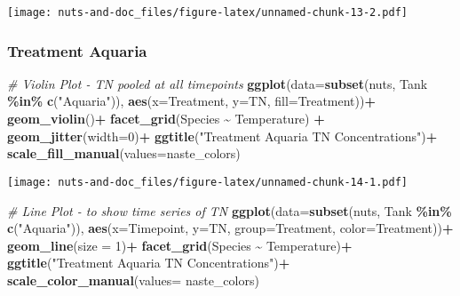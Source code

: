 \documentclass[
]{article}
\newenvironment{Shaded}{\begin{snugshade}}{\end{snugshade}}
\newcommand{\AttributeTok}[1]{\textcolor[rgb]{0.13,0.29,0.53}{#1}}
\newcommand{\CommentTok}[1]{\textcolor[rgb]{0.56,0.35,0.01}{\textit{#1}}}
\newcommand{\DecValTok}[1]{\textcolor[rgb]{0.00,0.00,0.81}{#1}}
\newcommand{\FunctionTok}[1]{\textcolor[rgb]{0.13,0.29,0.53}{\textbf{#1}}}
\newcommand{\NormalTok}[1]{#1}
\newcommand{\SpecialCharTok}[1]{\textcolor[rgb]{0.81,0.36,0.00}{\textbf{#1}}}
\newcommand{\StringTok}[1]{\textcolor[rgb]{0.31,0.60,0.02}{#1}}
\begin{document}
\texttt{[image: nuts-and-doc\_files/figure-latex/unnamed-chunk-13-2.pdf]}

\hypertarget{treatment-aquaria-3}{%
\subsubsection{Treatment Aquaria}\label{treatment-aquaria-3}}

\begin{Shaded}
\begin{Highlighting}[]
\CommentTok{\# Violin Plot {-} TN pooled at all timepoints}
\FunctionTok{ggplot}\NormalTok{(}\AttributeTok{data=}\FunctionTok{subset}\NormalTok{(nuts, Tank }\SpecialCharTok{\%in\%} \FunctionTok{c}\NormalTok{(}\StringTok{"Aquaria"}\NormalTok{)), }\FunctionTok{aes}\NormalTok{(}\AttributeTok{x=}\NormalTok{Treatment, }\AttributeTok{y=}\NormalTok{TN, }\AttributeTok{fill=}\NormalTok{Treatment))}\SpecialCharTok{+}
  \FunctionTok{geom\_violin}\NormalTok{()}\SpecialCharTok{+}
  \FunctionTok{facet\_grid}\NormalTok{(Species }\SpecialCharTok{\textasciitilde{}}\NormalTok{ Temperature) }\SpecialCharTok{+}
  \FunctionTok{geom\_jitter}\NormalTok{(}\AttributeTok{width=}\DecValTok{0}\NormalTok{)}\SpecialCharTok{+}
  \FunctionTok{ggtitle}\NormalTok{(}\StringTok{"Treatment Aquaria TN Concentrations"}\NormalTok{)}\SpecialCharTok{+}
  \FunctionTok{scale\_fill\_manual}\NormalTok{(}\AttributeTok{values=}\NormalTok{naste\_colors)}
\end{Highlighting}
\end{Shaded}

\texttt{[image: nuts-and-doc\_files/figure-latex/unnamed-chunk-14-1.pdf]}

\begin{Shaded}
\begin{Highlighting}[]
\CommentTok{\# Line Plot {-} to show time series of TN}
\FunctionTok{ggplot}\NormalTok{(}\AttributeTok{data=}\FunctionTok{subset}\NormalTok{(nuts, Tank }\SpecialCharTok{\%in\%} \FunctionTok{c}\NormalTok{(}\StringTok{"Aquaria"}\NormalTok{)), }\FunctionTok{aes}\NormalTok{(}\AttributeTok{x=}\NormalTok{Timepoint, }\AttributeTok{y=}\NormalTok{TN, }\AttributeTok{group=}\NormalTok{Treatment, }\AttributeTok{color=}\NormalTok{Treatment))}\SpecialCharTok{+}
  \FunctionTok{geom\_line}\NormalTok{(}\AttributeTok{size =} \DecValTok{1}\NormalTok{)}\SpecialCharTok{+}
  \FunctionTok{facet\_grid}\NormalTok{(Species }\SpecialCharTok{\textasciitilde{}}\NormalTok{ Temperature)}\SpecialCharTok{+}
  \FunctionTok{ggtitle}\NormalTok{(}\StringTok{"Treatment Aquaria TN Concentrations"}\NormalTok{)}\SpecialCharTok{+}
  \FunctionTok{scale\_color\_manual}\NormalTok{(}\AttributeTok{values=}\NormalTok{ naste\_colors)}
\end{Highlighting}
\end{Shaded}
\end{document}
